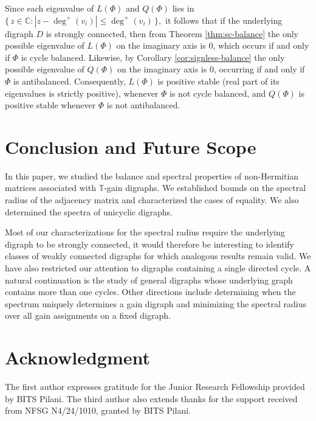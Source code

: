 \documentclass[12pt]{article}
\theoremstyle{definition}
\newcommand{\TT}{\mathbb{T}}
\begin{document}
Since each eigenvalue of $L(\Phi)$ and $Q(\Phi)$ lies in 
\(
  \bigl\{\, z \in \mathbb{C} : |z - \deg^{+}(v_i)| \le \deg^{+}(v_i) \,\bigr\},
\) it follows that if the underlying digraph $D$ is strongly connected, 
then from Theorem \ref{thm:sc-balance} the only possible eigenvalue of $L(\Phi)$ on the imaginary axis is $0$, which occurs if and only if $\Phi$ is cycle balanced. Likewise, by Corollary \ref{cor:signless-balance} the only possible eigenvalue of $Q(\Phi)$ on the imaginary axis is $0$, occurring if and only if $\Phi$ is antibalanced. Consequently, $L(\Phi)$ is positive stable (real part of its eigenvalues is strictly positive), whenever $\Phi$ is not cycle balanced, and $Q(\Phi)$ is positive stable whenever $\Phi$ is not antibalanced.

\section{Conclusion and Future Scope} \label{sec6}

In this paper, we studied the balance and spectral properties of non-Hermitian matrices associated with $\TT$-gain digraphs. We established bounds on the spectral radius of the adjacency matrix and characterized the cases of equality. We also determined the spectra of unicyclic digraphs.

Most of our characterizations 
for the spectral radius require the underlying digraph to be strongly connected, it would therefore be interesting to identify classes of weakly connected digraphs for which analogous results remain valid. We have also restricted our attention to digraphs containing a single directed cycle. A natural continuation is the study of general digraphs whose underlying graph contains more than one cycles.
Other directions include determining when the spectrum uniquely determines a gain digraph and minimizing the spectral radius over all gain assignments on a fixed digraph. 

\section{Acknowledgment}
The first author expresses gratitude for the Junior Research Fellowship provided by BITS Pilani. The third author also extends thanks for the support received from NFSG N4/24/1010, granted by BITS Pilani.




\end{document}
